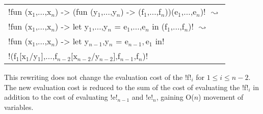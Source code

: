 \begin{tabular}{l}
!fun (x$_{1}$,$\ldots$,x$_n$) -> (fun (y$_{1}$,$\ldots$,y$_n$) -> (f$_{1}$,$\ldots$,f$_n$))(e$_{1}$,$\ldots$,e$_n$)! 
$\text{ $\leadsto$ }$ \\
!fun (x$_{1}$,$\ldots$,x$_n$) -> let y$_{1}$,$\ldots$,y$_n$ = e$_1$,$\ldots$,e$_n$ in (f$_{1}$,$\ldots$,f$_n$)! $\text{ $\leadsto$ }$ \\
!fun (x$_{1}$,$\ldots$,x$_n$) -> let y$_{n-1}$,y$_n$ = e$_{n-1},$e$_1$ in!\\
\hspace{3cm}!(f$_{1}$[x$_{1}$/y$_{1}$],$\ldots$,f$_{n-2}[$x$_{n-2}$/y$_{n-2}]$,f$_{n-1}$,f$_{n}$)!
\end{tabular}

This rewriting does not change the evaluation cost of the !f!$_{i}$ for $1\leq i \leq n-2$.
The new evaluation cost is reduced to the sum of the cost of evaluating 
the !f!$_{i}$ in addition to the cost of evaluating !e!$_{n-1}$ and !e!$_{n}$, gaining O($n$) movement of variables.

